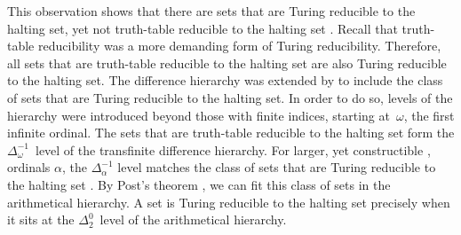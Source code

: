 This observation shows that there are sets that are Turing reducible to the halting set, yet not truth-table reducible to the halting set \parencite{epstein1981hierarchies,arslanov1997degree,downey2010algorithmic}.
Recall that truth-table reducibility was a more demanding form of Turing reducibility.
Therefore, all sets that are truth-table reducible to the halting set are also Turing reducible to the halting set.
The difference hierarchy was extended by \textcite{ershov1968hierarchyii} to include the class of sets that are Turing reducible to the halting set.
In order to do so, levels of the hierarchy were introduced beyond those with finite indices, starting at~$\omega$, the first infinite ordinal.
The sets that are truth-table reducible to the halting set form the $\Delta^{-1}_\omega$~level of the transfinite difference hierarchy.
For larger, yet constructible \parencite{rogers1967theory}, ordinals $\alpha$, the $\Delta^{-1}_\alpha$ level matches the class of sets that are Turing reducible to the halting set \parencite{ershov1968hierarchyii,epstein1981hierarchies}.
By Post's theorem \parencite{post1948degrees,rogers1967theory}, we can fit this class of sets in the arithmetical hierarchy.
A set is Turing reducible to the halting set precisely when it sits at the $\Delta^0_2$~level of the arithmetical hierarchy.

